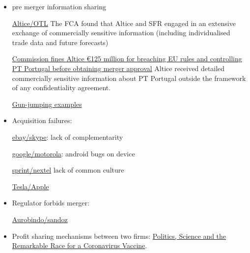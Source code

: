 \documentclass[a4paper,leqno]{article}%
\begin{document}
\begin{itemize}
    \item pre merger information sharing
    
    \href{https://sites-herbertsmithfreehills.vuturevx.com/46/12874/compose-email/the-altice-case--a-costly-warning-not-to-engage-in-gun-jumping-before-receiving-merger-control-clearance.asp}{Altice/OTL} The FCA found that Altice and SFR engaged in an extensive exchange of commercially sensitive information (including individualised trade data and future forecasts)
    
    \href{https://ec.europa.eu/commission/presscorner/detail/en/IP_18_3522}{Commission fines Altice €125 million for breaching EU rules and controlling PT Portugal before obtaining merger approval} Altice received detailed commercially sensitive information about PT Portugal outside the framework of any confidentiality agreement.
    
    \href{https://www.twobirds.com/en/news/articles/2020/global/double-caution-gun-jumping-risks-in-m-and-a-transactions}{Gun-jumping examples}
    \item Acquisition failures:
    
    \href{https://www.investopedia.com/articles/insights/061816/4-cases-when-ma-strategy-failed-acquirer-ebay-bac.asp}{ebay/skype}: lack of complementarity
    
    \href{https://salessynergy.net/the-biggest-acquisition-disasters-that-put-companies-into-quite-a-bit-of-trouble/}{google/motorola}: android bugs on device
    
    \href{https://www.investopedia.com/articles/financial-theory/08/merger-acquisition-disasters.asp#:~:text=The\%20consolidation\%20of\%20AOL\%20Time,combination\%20up\%20until\%20that\%20time}{sprint/nextel} lack of common culture
    
    \href{https://www.theguardian.com/technology/2020/dec/23/elon-musk-i-tried-to-sell-tesla-to-apple?CMP=Share_iOSApp_Other}{Tesla/Apple}

    
    \item Regulator forbids merger:
    
    \href{https://www.livemint.com/companies/news/aurobindo-pharma-calls-off-1-billion-deal-with-sandoz-after-failing-to-get-ftc-nod-11585801128011.html}{Aurobindo/sandoz}
    
    \item Profit sharing mechanisms between two firms: \href{https://www.nytimes.com/2020/11/21/us/politics/coronavirus-vaccine.html?referringSource=articleShare}{Politics, Science and the Remarkable Race for a Coronavirus Vaccine}.
\end{itemize}
\end{document}
